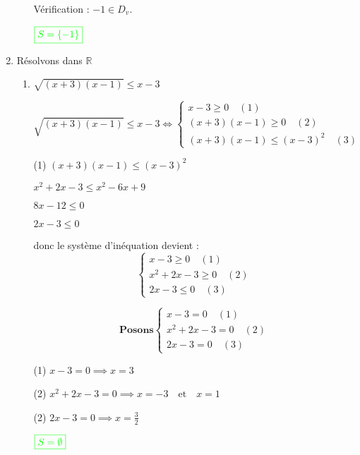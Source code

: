 \documentclass[12pt,a4paper]{article}
\begin{document}
\begin{enumerate}
\begin{enumerate}
\noindent Vérification : \( -1 \in D_v \).  
 
\(
\textcolor{green}{\boxed{S = \{ -1 \}  }} 
\)
    \end{enumerate} 
\item Résolvons dans \( \mathbb{R} \)

\begin{enumerate}
\item \(\sqrt{(x+3)(x-1)} \leq x-3\)

\[
\sqrt{(x+3)(x-1)} \leq x-3 \iff 
\begin{cases}
x-3 \geq 0 \quad (1) \\
(x+3)(x-1) \geq 0 \quad (2) \\
(x+3)(x-1) \leq (x-3)^2 \quad (3)
\end{cases}
\]
 
(1) \((x+3)(x-1) \leq (x-3)^2\)

\(
x^2 + 2x - 3 \leq x^2 - 6x + 9
\)

\(
8x - 12 \leq 0
\)

\(
2x - 3 \leq 0
\)

\noindent donc le système d'inéquation devient :  
\[
\begin{cases}
x-3 \geq 0 \quad (1) \\
x^2 + 2x - 3 \geq 0 \quad (2) \\
2x - 3 \leq 0 \quad (3)
\end{cases}
\]
 
\[\textbf{Posons}
\begin{cases}
x-3 = 0 \quad (1) \\
x^2 + 2x - 3 = 0 \quad (2) \\
2x - 3 = 0 \quad (3)
\end{cases}
\]
 
(1) \( x - 3 = 0 \implies x = 3 \)

(2) \( x^2 + 2x - 3 = 0 \implies x = -3 \quad \text{et} \quad x = 1 \)

(2)  \( 2x - 3 = 0 \implies x = \frac{3}{2} \)


\begin{flushleft}
\end{flushleft}
\begin{center}
\(
\textcolor{green}{\boxed{S = \emptyset }} 
\)
\end{center}


\end{enumerate}
\end{enumerate}
\end{document}
